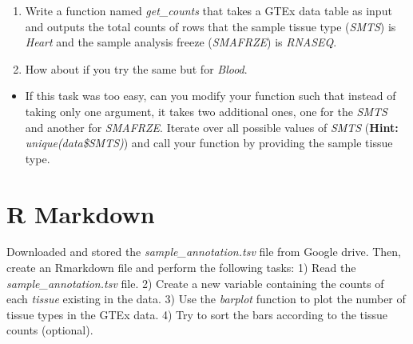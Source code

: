 \documentclass[]{article}
\providecommand{\tightlist}{%
  \setlength{\itemsep}{0pt}\setlength{\parskip}{0pt}}
\begin{document}
\begin{enumerate}
\def\labelenumi{\arabic{enumi})}
\tightlist
\item
  Write a function named \emph{get\_counts} that takes a GTEx data table as input and outputs the total counts of rows that the sample tissue type (\emph{SMTS}) is \emph{Heart} and the sample analysis freeze (\emph{SMAFRZE}) is \emph{RNASEQ}.
\item
  How about if you try the same but for \emph{Blood}.
\end{enumerate}

\begin{itemize}
\tightlist
\item
  If this task was too easy, can you modify your function such that instead of taking only one argument, it takes two additional ones, one for the \emph{SMTS} and another for \emph{SMAFRZE}. Iterate over all possible values of \emph{SMTS} (\textbf{Hint:} \emph{unique(data\$SMTS)}) and call your function by providing the sample tissue type.
\end{itemize}

\hypertarget{r-markdown}{%
\section{R Markdown}\label{r-markdown}}

Downloaded and stored the \emph{sample\_annotation.tsv} file from Google drive. Then, create an Rmarkdown file and perform the following tasks:
1) Read the \emph{sample\_annotation.tsv} file.
2) Create a new variable containing the counts of each \emph{tissue} existing in the data.
3) Use the \emph{barplot} function to plot the number of tissue types in the GTEx data.
4) Try to sort the bars according to the tissue counts (optional).
\end{document}
